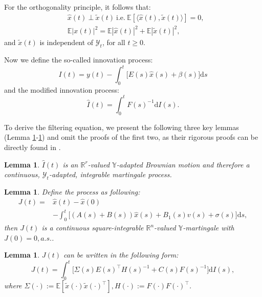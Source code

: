 \documentclass[lettersize,journal]{IEEEtran}
\theoremstyle{plain}
\newtheorem{lem}[thm]{Lemma}
\theoremstyle{definition}
\begin{document}
For the orthogonality principle, it follows that:
\begin{equation*}
	\begin{aligned}
		&\widehat{x}(t) \:\bot \:\widetilde{x}(t) \: \text{i.e.} \: \mathbb{E}[\langle \widehat{x}(t),\widetilde{x}(t) \rangle] = 0,\\
		&\mathbb{E}|x(t)|^2 = \mathbb{E}|\widehat{x}(t)|^2 + \mathbb{E}|\widetilde{x}(t)|^2,
	\end{aligned}
\end{equation*}
and $\widetilde{x}(t)$ is independent of $\mathcal{Y}_t$, for all $t \geq 0$.

Now we define the so-called innovation process:
\begin{equation}\label{eq:3.3}
	I(t) = y(t) - \int_0^t \Big[E(s)\widehat{x}(s) + \beta(s)\Big]\mathrm{d}s
\end{equation}
and the modified innovation process:
\begin{equation}\label{eq:3.4}
	\widehat{I}(t) = \int_{0}^{t} F(s)^{-1} \mathrm{d}I(s).
\end{equation}

To derive the filtering equation, we present the following three key lemmas (Lemma \ref{lem:3.1}-\ref{lem:3.3}) and omit the proofs of the first two, as their rigorous proofs can be directly found in \cite{Sun2022}.

\begin{lem}\label{lem:3.1}
	$\widehat{I}(t)$ is an $\mathbb{R}^r$-valued $\mathbb{Y}$-adapted Brownian motion and therefore a continuous, $\mathcal{Y}_t$-adapted, integrable martingale process.
\end{lem}


\begin{lem}\label{lem:3.2}
	Define the process as following:
	\begin{equation}\label{eq:3.5}
		\begin{aligned}
			J(t) = &\widehat{x}(t) - \widehat{x}(0)\\
			&- \int_{0}^{t} \Big[ (A(s) + B(s))\widehat{x}(s) + B_1(s)v(s) + \sigma(s) \Big]\mathrm{d}s,
		\end{aligned}
	\end{equation}
	then $J(t)$ is a continuous square-integrable $\mathbb{R}^{n}$-valued $\mathbb{Y}$-martingale with $J(0) = 0, a.s.$.
\end{lem}


\begin{lem}\label{lem:3.3}
	$J(t)$ can be written in the following form:
	\begin{equation*}
		J(t) = \int_{0}^{t} \Big[\Sigma(s)E(s)^{\top}H(s)^{-1} + C(s)F(s)^{-1}\Big]\mathrm{d}I(s),
	\end{equation*}
	where $\Sigma(\cdot) := \mathbb{E}[\widetilde{x}(\cdot)\widetilde{x}(\cdot)^{\top}], H(\cdot) := F(\cdot)F(\cdot)^{\top}$.
\end{lem}
\end{document}
